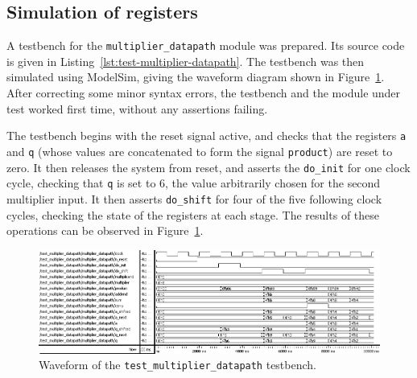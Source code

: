 \documentclass[a4paper]{article}
\begin{document}
\subsection{Simulation of registers}
\label{sec:reg:sim}

A testbench for the \texttt{multiplier\_datapath} module was prepared. Its source code is given in Listing~\ref{lst:test-multiplier-datapath}. The testbench was then simulated using ModelSim, giving the waveform diagram shown in Figure~\ref{fig:test-multiplier-datapath}. After correcting some minor syntax errors, the testbench and the module under test worked first time, without any assertions failing.

The testbench begins with the reset signal active, and checks that the registers \texttt{a} and \texttt{q} (whose values are concatenated to form the signal \texttt{product}) are reset to zero. It then releases the system from reset, and asserts the \texttt{do\_init} for one clock cycle, checking that \texttt{q} is set to 6, the value arbitrarily chosen for the second multiplier input. It then asserts \texttt{do\_shift} for four of the five following clock cycles, checking the state of the registers at each stage. The results of these operations can be observed in Figure~\ref{fig:test-multiplier-datapath}.

\begin{figure}[ht]
  \centering
  \includegraphics[width=\textwidth]{assets/test_multiplier_datapath}
  \caption{Waveform of the \texttt{test\_multiplier\_datapath} testbench.}
  \label{fig:test-multiplier-datapath}
\end{figure}
\end{document}
